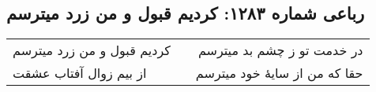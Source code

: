 \begin{center}
\section*{رباعی شماره ۱۲۸۳: کردیم قبول و من زرد میترسم}
\label{sec:1283}
\begin{longtable}{l p{0.5cm} r}
کردیم قبول و من زرد میترسم
&&
در خدمت تو ز چشم بد میترسم
\\
از بیم زوال آفتاب عشقت
&&
حقا که من از سایهٔ خود میترسم
\\
\end{longtable}
\end{center}
